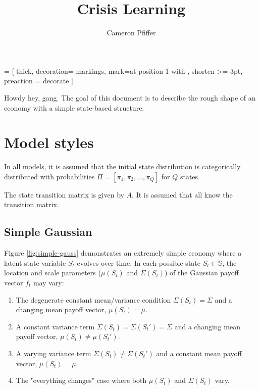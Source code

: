 \documentclass{article}
\title{Crisis Learning}
\author{Cameron Pfiffer}
\begin{document}
\newcommand{\Var}{\text{Var}}

 = [
	thick, 
	decoration={
		markings,
		mark=at position 1 with {
			}
		}, 
	shorten >= 3pt, preaction = {decorate}
	]

\maketitle

Howdy hey, gang. The goal of this document is to describe the rough shape of an economy with a simple state-based structure. 

\section{Model styles}

In all models, it is assumed that the initial state distribution is categorically distributed with probabilities $\Pi = [\pi_1, \pi_2, \dots, \pi_Q]$ for $Q$ states.

The state transition matrix is given by $A$. It is assumed that all know the transition matrix. 

\subsection{Simple Gaussian}

Figure \ref{fig:simple-gauss} demonstrates an extremely simple economy where a latent state variable $S_t$ evolves over time. In each possible state $S_t \in \mathbb{S}$, the location and scale parameters ($\mu(S_t)$ and $\Sigma(S_t)$) of the Gaussian payoff vector $f_t$ may vary:

\begin{enumerate}
    \item The degenerate constant mean/variance condition
    $\Sigma(S_t)= \Sigma$ and a changing mean payoff vector, $\mu(S_t) = \mu$.
    \item A constant variance term $\Sigma(S_t) = \Sigma(S_t') = \Sigma$ and a changing mean payoff vector, $\mu(S_t) \ne \mu(S_t')$.
    \item A varying variance term $\Sigma(S_t) \ne \Sigma(S_t')$ and a constant mean payoff vector, $\mu(S_t) = \mu$.
    \item The "everything changes" case where both $\mu(S_t)$ and $\Sigma(S_t)$ vary.
\end{enumerate}
\end{document}
